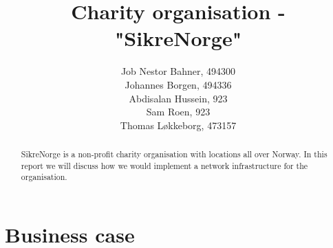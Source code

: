 
\newcommand{\notetous}[1] {
  \textbf{\textit{\textcolor{red}{#1}}}
}



\title{Charity organisation - "SikreNorge"}

\author{
  Job Nestor Bahner, 494300\\
  Johannes Borgen, 494336\\
  Abdisalan Hussein, 923\\
  Sam Roen, 923\\
  Thomas Løkkeborg, 473157
}



\maketitle

\begin{abstract}
SikreNorge is a non-profit charity organisation with locations all over Norway. In this report we will discuss how we would implement a network infrastructure for the organisation.
\end{abstract}

\thispagestyle{empty}

\clearpage
{}
\setcounter{page}{1}
\tableofcontents

\clearpage
{}


\section{Business case}

